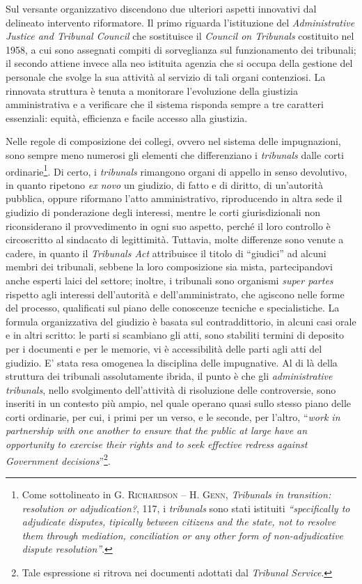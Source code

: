 \documentclass[12pt,it,a4paper,]{report}
\begin{document}
Sul versante organizzativo discendono due ulteriori aspetti innovativi
dal delineato intervento riformatore. Il primo riguarda l'istituzione
del \emph{Administrative Justice and Tribunal Council} che sostituisce
il \emph{Council on Tribunals} costituito nel 1958, a cui sono assegnati
compiti di sorveglianza sul funzionamento dei tribunali; il secondo
attiene invece alla neo istituita agenzia che si occupa della gestione
del personale che svolge la sua attività al servizio di tali organi
contenziosi. La rinnovata struttura è tenuta a monitorare l'evoluzione
della giustizia amministrativa e a verificare che il sistema risponda
sempre a tre caratteri essenziali: equità, efficienza e facile accesso
alla giustizia.

Nelle regole di composizione dei collegi, ovvero nel sistema delle
impugnazioni, sono sempre meno numerosi gli elementi che differenziano i
\emph{tribunals} dalle corti ordinarie\footnote{Come sottolineato in G.
  \textsc{Richardson} -- H. \textsc{Genn}, \emph{Tribunals in
  transition: resolution or adjudication?}, 117, i \emph{tribunals} sono
  stati istituiti \emph{``specifically to adjudicate disputes, tipically
  between citizens and the state, not to resolve them through mediation,
  conciliation or any other form of non-adjudicative dispute
  resolution''}.}. Di certo, i \emph{tribunals} rimangono organi di
appello in senso devolutivo, in quanto ripetono \emph{ex novo} un
giudizio, di fatto e di diritto, di un'autorità pubblica, oppure
riformano l'atto amministrativo, riproducendo in altra sede il giudizio
di ponderazione degli interessi, mentre le corti giurisdizionali non
riconsiderano il provvedimento in ogni suo aspetto, perché il loro
controllo è circoscritto al sindacato di legittimità. Tuttavia, molte
differenze sono venute a cadere, in quanto il \emph{Tribunals Act}
attribuisce il titolo di ``giudici'' ad alcuni membri dei tribunali,
sebbene la loro composizione sia mista, partecipandovi anche esperti
laici del settore; inoltre, i tribunali sono organismi \emph{super
partes} rispetto agli interessi dell'autorità e dell'amministrato, che
agiscono nelle forme del processo, qualificati sul piano delle
conoscenze tecniche e specialistiche. La formula organizzativa del
giudizio è basata sul contraddittorio, in alcuni casi orale e in altri
scritto: le parti si scambiano gli atti, sono stabiliti termini di
deposito per i documenti e per le memorie, vi è accessibilità delle
parti agli atti del giudizio. E' stata resa omogenea la disciplina delle
impugnative. Al di là della struttura dei tribunali assolutamente
ibrida, il punto è che gli \emph{administrative tribunals}, nello
svolgimento dell'attività di risoluzione delle controversie, sono
inseriti in un contesto più ampio, nel quale operano quasi sullo stesso
piano delle corti ordinarie, per cui, i primi per un verso, e le
seconde, per l'altro, ``\emph{work in partnership with one another to
ensure that the public at large have an opportunity to exercise their
rights and to seek effective redress against Government
decisions}''\footnote{Tale espressione si ritrova nei documenti adottati
  dal \emph{Tribunal Service}.}.
\end{document}

